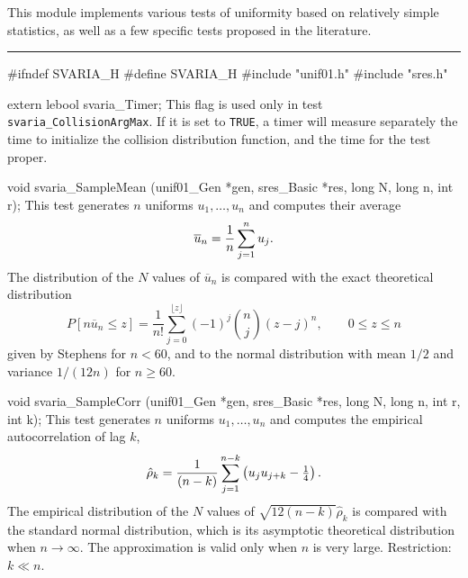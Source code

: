 
This module implements various tests of uniformity based on
relatively simple statistics, as well as a few specific tests proposed 
in the literature. \resdef


\bigskip
\hrule
\code\hide
#ifndef SVARIA_H
#define SVARIA_H
\endhide
#include "unif01.h"
#include "sres.h"
\endcode

\ifdetailed  %
\code


extern lebool svaria_Timer;
\endcode
 \tab
   This flag is used only in test  {\tt svaria\_CollisionArgMax}.
   If it is set to {\tt TRUE}, a timer will measure separately the time to
   initialize the collision distribution function, and the time for the
   test proper.
 \endtab

\fi   %


\code

void svaria_SampleMean (unif01_Gen *gen, sres_Basic *res,
                        long N, long n, int r);
\endcode
 \tab
   This test generates $n$ uniforms $u_1,\dots,u_n$ and computes
   their average
    $$ \overline u_n = {1\over n} \sum_{j=1}^n u_j.$$
   The distribution of the $N$ values of $\overline u_n$ is compared
   with the exact theoretical distribution
$$
   P[n \overline u_n \le z] = \frac 1 {n!}
      \sum_{j = 0}^{\lfloor z \rfloor} (-1)^j {n \choose j} (z - j)^n,
     \qquad 0 \le z \le n
$$
   given by Stephens \cite{tSTE66a}
   for $n < 60$, and to the normal distribution with mean $1/2$
   and variance $1/(12n)$ for $n\ge 60$.
 \endtab
\code


void svaria_SampleCorr (unif01_Gen *gen, sres_Basic *res,
                        long N, long n, int r, int k);
\endcode
 \tab
  This test generates $n$ uniforms $u_1,\dots,u_n$ and
   computes  
  the empirical autocorrelation \cite{sFIS78a} of lag $k$,
    $$
     \hat\rho_k = {1 \over (n-k)} \sum_{j=1}^{n-k} 
               \left(u_j u_{j+k} - {\textstyle \frac14}\right).
    $$
   The empirical distribution
   of the $N$ values of $\sqrt{12 (n-k)} \hat\rho_k$  
   is compared with the standard normal distribution,
   which is its asymptotic theoretical distribution when $n \to\infty$.
   The approximation is valid only when $n$ is very large.
   Restriction: $k \ll n$.
 \endtab
\code



